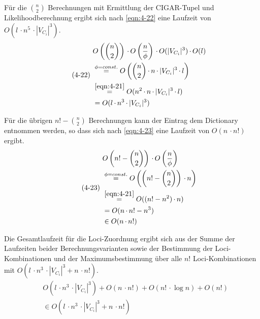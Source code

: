 Für die $\binom{n}{2}$ Berechnungen mit Ermittlung der CIGAR-Tupel und Likelihoodberechnung ergibt sich nach \eqref{eqn:4-22} eine Laufzeit von $ O( l\, \cdotp n^5  \, \cdotp |V_{C_{i}}|^3) $.
\begin{equation} \label{eqn:4-22}
\tag{4-22}
\begin{aligned}
&\ {} O\left( \binom{n}{2}\right)  \, \cdotp O\left(\frac{n}{\phi} \right) \, \cdotp O(|V_{C_{i}}|^3) \, \cdotp O(l)  \\
&\ \stackrel{\phi = const.}{=} O\left( \binom{n}{2} \, \cdotp n \, \cdotp |V_{C_{i}}|^3 \, \cdotp l \right) \\
&\ \stackrel{\eqref{eqn:4-21}}{=} O( n^2 \, \cdotp n \, \cdotp |V_{C_{i}}|^3 \, \cdotp l) \\
&\ = O( l\, \cdotp n^3  \, \cdotp |V_{C_{i}}|^3)\\
\end{aligned}
\end{equation}

Für die übrigen $n! - \binom{n}{2}$ Berechnungen kann der Eintrag dem Dictionary entnommen werden, so dass sich nach \eqref{eqn:4-23} eine Laufzeit von $O(n  \, \cdotp n!)$ ergibt.
\begin{equation} \label{eqn:4-23}
\tag{4-23}
\begin{aligned}
&\ {} O\left( n! - \binom{n}{2}\right)  \, \cdotp O\left(\frac{n}{\phi} \right)  \\
&\ \stackrel{\phi = const.}{=} O\left( \left( n! - \binom{n}{2}\right)  \, \cdotp n \right)\\
&\ \stackrel{\eqref{eqn:4-21}}{=} O((n! - n^2)  \, \cdotp n )\\
&\ = O( n \, \cdotp n! - n^3)\\
&\ \in O(n  \, \cdotp n!)\\
\end{aligned}
\end{equation}

Die Gesamtlaufzeit für die Loci-Zuordnung ergibt sich aus der Summe der Laufzeiten beider Berechnungsvarianten sowie der Bestimmung der Loci-Kombinationen und der Maximumsbestimmung über alle $n!$ Loci-Kombinationen mit $O( l\, \cdotp n^3  \, \cdotp |V_{C_{i}}|^3 + n  \, \cdotp n!)$. 
\begin{equation} \label{eqn:4-24}
\tag{4-24}
\begin{aligned}
&\ {} O( l\, \cdotp n^3  \, \cdotp |V_{C_{i}}|^3) + O(n  \, \cdotp n!) + O(n ! \, \cdotp \log n) + O(n!) \\
&\ \in O( l\, \cdotp n^3  \, \cdotp |V_{C_{i}}|^3 + n  \, \cdotp n!)
\end{aligned}
\end{equation}


